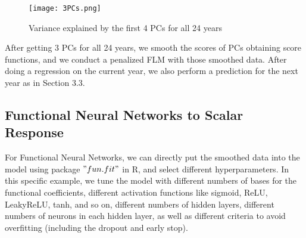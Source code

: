 \begin{figure}[H] %
\centering %
\texttt{[image: 3PCs.png]} %
\caption{Variance explained by the first 4 PCs for all 24 years} %
\label{fig:pcr} %
\end{figure}
After getting 3 PCs for all 24 years, we smooth the scores of PCs obtaining score functions, and we conduct a penalized FLM with those smoothed data. After doing a regression on the current year, we also perform a prediction for the next year as in Section 3.3.

\subsection{Functional Neural Networks to Scalar Response}
For Functional Neural Networks, we can directly put the smoothed data into the model using package $" fun.fit"$ in R, and select different hyperparameters. In this specific example, we tune the model with different numbers of bases for the functional coefficients, different activation functions like sigmoid, ReLU, LeakyReLU, tanh, and so on, different numbers of hidden layers, different numbers of neurons in each hidden layer, as well as different criteria to avoid overfitting (including the dropout and early stop).

